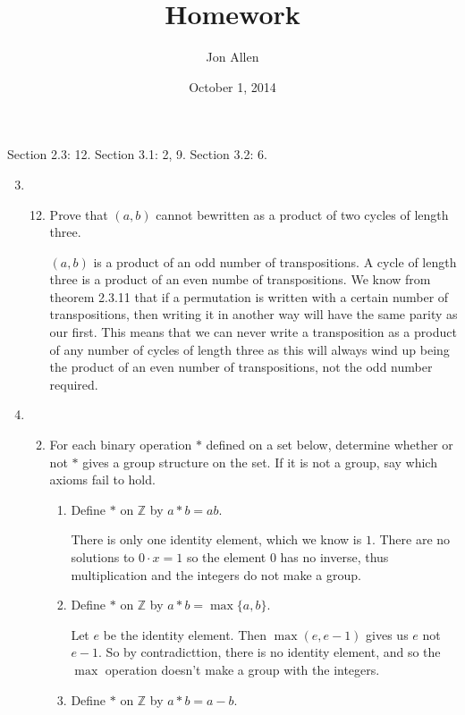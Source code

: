 \documentclass[letterpaper]{article}
\begin{document}
\title{Homework}
\date{October 1, 2014}
\author{Jon Allen}
\maketitle
Section 2.3: 12.
Section 3.1: 2, 9.
Section 3.2: 6.    
\renewcommand{\labelenumi}{2.\arabic{enumi}}
\renewcommand{\labelenumii}{\arabic{enumii}.}
\renewcommand{\labelenumiii}{(\alph{enumiii})}
\begin{enumerate}
\setcounter{enumi}{2}
\item
  \begin{enumerate}
  \setcounter{enumii}{11}
  \item
    Prove that $(a,b)$ cannot bewritten as a product of two cycles of length three.

    $(a,b)$ is a product of an odd number of transpositions. A cycle of length three is a product of an even numbe of transpositions. We know from theorem 2.3.11 that if a permutation is written with a certain number of transpositions, then writing it in another way will have the same parity as our first. This means that we can never write a transposition as a product of any number of cycles of length three as this will always wind up being the product of an even number of transpositions, not the odd number required.
  \end{enumerate}
\renewcommand{\labelenumi}{3.\arabic{enumi}}
\setcounter{enumi}{0}
\item
  \begin{enumerate}  
  \setcounter{enumii}{1}
  \item
    For each binary operation $*$ defined on a set below, determine whether or not $*$ gives a group structure on the set. If it is not a group, say which axioms fail to hold.
    \begin{enumerate}
    \item
      Define $*$ on $\mathbb{Z}$ by $a*b=ab$.

      There is only one identity element, which we know is $1$. There are no solutions to $0\cdot x=1$ so the element $0$ has no inverse, thus multiplication and the integers do not make a group.
    \item
      Define $*$ on $\mathbb{Z}$ by $a*b=\max\{a,b\}$.

      Let $e$ be the identity element. Then $\max(e,e-1)$ gives us $e$ not $e-1$. So by contradicttion, there is no identity element, and so the $\max$ operation doesn't make a group with the integers.
    \item
      Define $*$ on $\mathbb{Z}$ by $a*b=a-b$.


\end{enumerate}
\end{enumerate}
\end{enumerate}
\end{document}
